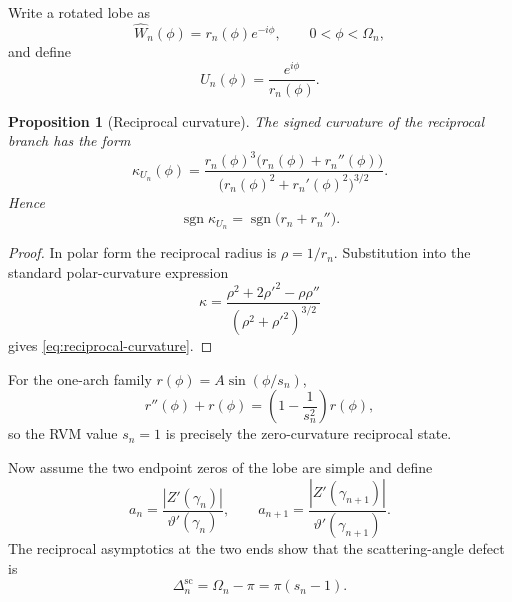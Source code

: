 \documentclass[11pt]{amsart}
\numberwithin{equation}{section}
\newtheorem{proposition}[theorem]{Proposition}
\theoremstyle{definition}
\theoremstyle{remark}
\newcommand{\sgn}{\operatorname{sgn}}
\begin{document}
Write a rotated lobe as
\begin{equation}
\widehat W_n(\phi)=r_n(\phi)e^{-i\phi},
\qquad 0<\phi<\Omega_n,
\label{eq:lobe-phi}
\end{equation}
and define
\begin{equation}
U_n(\phi)=\frac{e^{i\phi}}{r_n(\phi)}.
\label{eq:Un-phi}
\end{equation}

\begin{proposition}[Reciprocal curvature]
\label{prop:reciprocal-curvature}
The signed curvature of the reciprocal branch has the form
\begin{equation}
\kappa_{U_n}(\phi)
=
\frac{r_n(\phi)^3\bigl(r_n(\phi)+r_n''(\phi)\bigr)}
{\bigl(r_n(\phi)^2+r_n'(\phi)^2\bigr)^{3/2}}.
\label{eq:reciprocal-curvature}
\end{equation}
Hence
\begin{equation}
\sgn\kappa_{U_n}=\sgn\bigl(r_n+r_n''\bigr).
\label{eq:reciprocal-curvature-sign}
\end{equation}
\end{proposition}

\begin{proof}
In polar form the reciprocal radius is $\rho=1/r_n$.  Substitution into the standard polar-curvature expression
\begin{equation}
\kappa=\frac{\rho^2+2\rho'^2-\rho\rho''}{(\rho^2+\rho'^2)^{3/2}}
\label{eq:polar-curvature}
\end{equation}
gives \eqref{eq:reciprocal-curvature}.
\end{proof}

For the one-arch family $r(\phi)=A\sin(\phi/s_n)$,
\begin{equation}
r''(\phi)+r(\phi)=\left(1-\frac1{s_n^2}\right)r(\phi),
\label{eq:arch-curvature-sign}
\end{equation}
so the RVM value $s_n=1$ is precisely the zero-curvature reciprocal state.

Now assume the two endpoint zeros of the lobe are simple and define
\begin{equation}
a_n=\frac{|Z'(\gamma_n)|}{\vartheta'(\gamma_n)},
\qquad
a_{n+1}=\frac{|Z'(\gamma_{n+1})|}{\vartheta'(\gamma_{n+1})}.
\label{eq:a-endpoints}
\end{equation}
The reciprocal asymptotics at the two ends show that the scattering-angle defect is
\begin{equation}
\Delta_n^{\mathrm{sc}}=\Omega_n-\pi=\pi(s_n-1).
\label{eq:scattering-angle-defect}
\end{equation}
\end{document}
